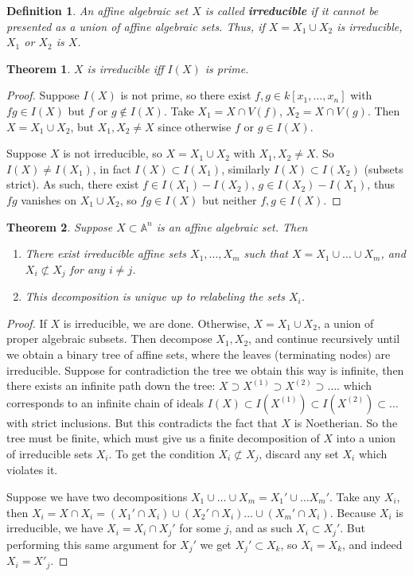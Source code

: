\documentclass[12pt]{article}
\newcommand{\A}{\mathbb{A}}
\newtheorem{definition}{Definition}[section]
\newtheorem{theorem}{Theorem}[section]
\begin{document}
    \begin{definition}
        An affine algebraic set $X$ is called \textbf{irreducible} if it cannot be presented as a union of affine algebraic sets. Thus, if $X = X_1 \cup X_2$ is irreducible, $X_1$ or $X_2$ is $X$.
    \end{definition}
    \begin{theorem} \label{thm:irr_iff_prime}
        $X$ is irreducible iff $I(X)$ is prime.
    \end{theorem}
    \begin{proof}
        Suppose $I(X)$ is not prime, so there exist $f, g \in k[x_1, \dots, x_n]$ with $fg \in I(X)$ but $f$ or $g \not \in I(X)$. Take $X_1 = X \cap V(f)$, $X_2 = X \cap V(g)$. Then $X = X_1 \cup X_2$, but $X_1, X_2 \neq X$ since otherwise $f$ or $g \in I(X)$. \par
        Suppose $X$ is not irreducible, so $X = X_1 \cup X_2$ with $X_1, X_2 \neq X$. So $I(X) \neq I(X_1)$, in fact $I(X) \subset I(X_1)$, similarly $I(X) \subset I(X_2)$ (subsets strict). As such, there exist $f \in I(X_1) - I(X_2)$, $g \in I(X_2) - I(X_1)$, thus $fg$ vanishes on $X_1 \cup X_2$, so $fg \in I(X)$ but neither $f, g \in I(X)$.
    \end{proof}
    \begin{theorem}
        Suppose $X \subset \A^n$ is an affine algebraic set. Then
        \begin{enumerate}
            \item There exist irreducible affine sets $X_1, \dots, X_m$ such that $X = X_1 \cup \dots \cup X_m$, and $X_i \not \subset X_j$ for any $i \neq j$.
            \item This decomposition is unique up to relabeling the sets $X_i$.
        \end{enumerate}
    \end{theorem}
    \begin{proof}
        If $X$ is irreducible, we are done. Otherwise, $X = X_1 \cup X_2$, a union of proper algebraic subsets. Then decompose $X_1, X_2$, and continue recursively until we obtain a binary tree of affine sets, where the leaves (terminating nodes) are irreducible. Suppose for contradiction the tree we obtain this way is infinite, then there exists an infinite path down the tree: $X \supset X^{(1)} \supset X^{(2)} \supset \dots $. which corresponds to an infinite chain of ideals $I(X) \subset I(X^{(1)}) \subset I(X^{(2)}) \subset \dots $ with strict inclusions. But this contradicts the fact that $X$ is Noetherian. So the tree must be finite, which must give us a finite decomposition of $X$ into a union of irreducible sets $X_i$. To get the condition $X_i \not \subset X_j$, discard any set $X_i$ which violates it. \par
        Suppose we have two decompositions $X_1 \cup \dots \cup X_m = X_1' \cup \dots X_m'$. Take any $X_i$, then $X_i = X \cap X_i = (X_1' \cap X_i) \cup (X_2' \cap X_i) \dots \cup (X_m' \cap X_i)$. Because $X_i$ is irreducible, we have $X_i = X_i \cap X_j'$ for some $j$, and as such $X_i \subset X_j'$. But performing this same argument for $X_j'$ we get $X_j' \subset X_k$, so $X_i = X_k$, and indeed $X_i = X'_j$.
    \end{proof}
\end{document}

